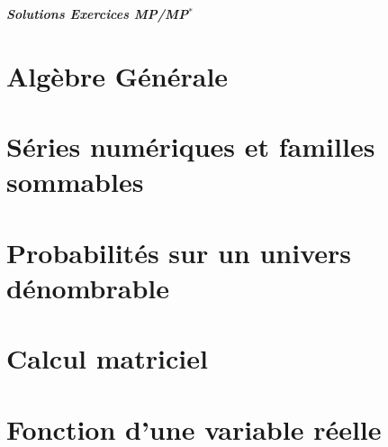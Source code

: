 \documentclass[12pt]{article}
\theoremstyle{remark}
\numberwithin{equation}{section}
\begin{document}
\begin{titlepage}
	\centering
	\vspace*{\fill}
	\Huge \textit{\textbf{Solutions Exercices MP/MP$^*$}}
	\vspace*{\fill}
\end{titlepage}

\cleardoublepage

\tableofcontents

\cleardoublepage

\section{Algèbre Générale}
\section{Séries numériques et familles sommables}
\section{Probabilités sur un univers dénombrable}
\section{Calcul matriciel}



\section{Fonction d'une variable réelle}
\end{document}
